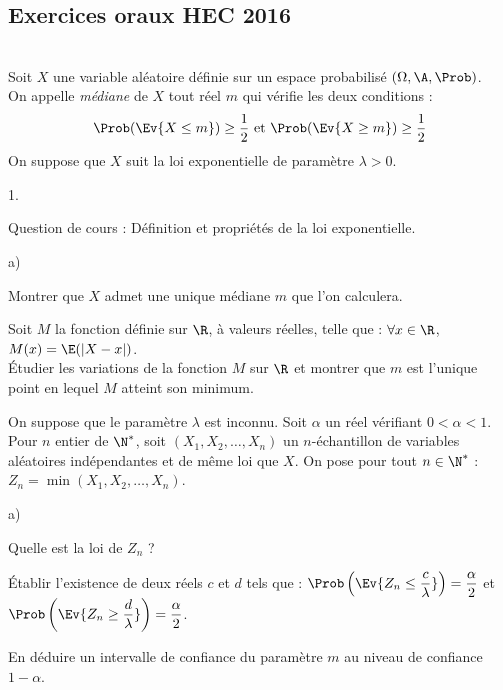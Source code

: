 \subsection*{Exercices oraux HEC 2016}


\begin{exerciceAP}~\\
  Soit $X$ une variable aléatoire définie sur un espace probabilisé
  $(\Omega,\A,\Prob)$.\\
  On appelle {\it médiane} de $X$ tout réel $m$ qui vérifie les deux
  conditions :
  \[
  \Prob(\Ev{X\leq m}) \geq \dfrac{1}{2} \ \text{et} \ 
  \Prob(\Ev{X\geq m})\geq \dfrac{1}{2}
  \]
  On suppose que $X$ suit la loi exponentielle de paramètre $\lambda>0$.
  \begin{noliste}{1.}
    \setlength{\itemsep}{2mm}
  \item Question de cours : Définition et propriétés de la loi
    exponentielle.
    
    
  
  \item
    \begin{noliste}{a)}
    \setlength{\itemsep}{2mm}
    \item Montrer que $X$ admet une unique médiane $m$ que l'on
      calculera.
      
    
    
    \item Soit $M$ la fonction définie sur $\R$, à valeurs réelles, 
    telle que : $\forall x\in\R$, $M(x)=\E(\vert X-x\vert)$.\\
    Étudier les variations de la fonction $M$ sur $\R$ et montrer 
    que $m$ est l'unique point en lequel $M$ atteint son minimum.
    
    
  \end{noliste}
  
  \item On suppose que le paramètre $\lambda$ est inconnu. Soit 
  $\alpha$ un réel vérifiant $0<\alpha<1$.\\
  Pour $n$ entier de $\N^*$, soit $(X_1,X_2,\hdots,X_n)$ un 
  $n$-échantillon de variables aléatoires indépendantes et de même loi 
  que $X$. On pose pour tout $n\in\N^*$ : $Z_n = 
  \min(X_1,X_2,\hdots,X_n)$.
  \begin{noliste}{a)}
    \setlength{\itemsep}{2mm}
    \item Quelle est la loi de $Z_n$ ?
    
    \item Établir l'existence de deux réels $c$ et $d$ tels que : 
    $\Prob\left(\Ev{ Z_n \leq \dfrac{c}{\lambda}}\right) = 
    \dfrac{\alpha}{2}$ et $\Prob\left(\Ev{ Z_n \geq 
    \dfrac{d}{\lambda}}\right)=\dfrac{\alpha}{2}$.
    
    \item En déduire un intervalle de confiance du paramètre $m$ au 
    niveau de confiance $1-\alpha$.
  \end{noliste}
\end{noliste}
\end{exerciceAP} 



